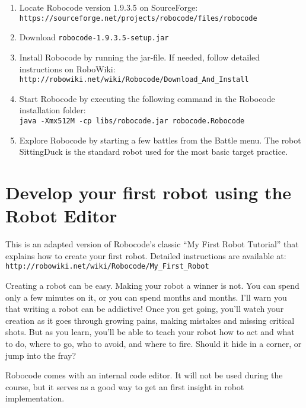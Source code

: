 \documentclass{scrreprt}
\begin{document}
\begin{enumerate}
\item Locate Robocode version 1.9.3.5 on SourceForge:\\\texttt{https://sourceforge.net/projects/robocode/files/robocode}
\item Download \texttt{robocode-1.9.3.5-setup.jar}
\item Install Robocode by running the jar-file. If needed, follow detailed instructions on RoboWiki:\\\texttt{http://robowiki.net/wiki/Robocode/Download\_And\_Install}
\item Start Robocode by executing the following command in the Robocode installation folder:\\
\texttt{java~-Xmx512M~-cp~libs/robocode.jar~robocode.Robocode}
\item Explore Robocode by starting a few battles from the Battle menu. The robot SittingDuck is the standard robot used for the most basic target practice.
\end{enumerate}

\section{Develop your first robot using the Robot Editor} \label{sec:myfirstrobot}
This is an adapted version of Robocode's classic ``My First Robot Tutorial'' that explains how to create your first robot. Detailed instructions are available at:\\\texttt{http://robowiki.net/wiki/Robocode/My\_First\_Robot}

Creating a robot can be easy. Making your robot a winner is not. You can spend only a few minutes on it, or you can spend months and months. I'll warn you that writing a robot can be addictive! Once you get going, you'll watch your creation as it goes through growing pains, making mistakes and missing critical shots. But as you learn, you'll be able to teach your robot how to act and what to do, where to go, who to avoid, and where to fire. Should it hide in a corner, or jump into the fray?

Robocode comes with an internal code editor. It will not be used during the course, but it serves as a good way to get an first insight in robot implementation.
\end{document}
